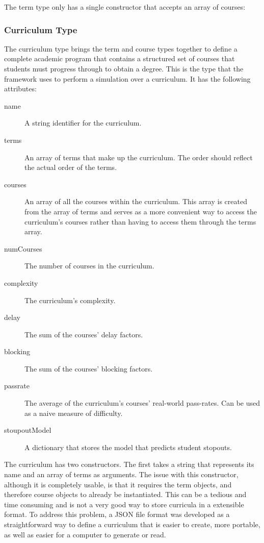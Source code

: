 \documentclass[botnum, fleqn]{unmeethesis}
\begin{document}
      The term type only has a single constructor that accepts an array of courses:

      

    \subsubsection{Curriculum Type}
      The curriculum type brings the term and course types together to define a complete academic program that contains a structured set of courses that students must progress through to obtain a degree. This is the type that the framework uses to perform a simulation over a curriculum. It has the following attributes:

      \begin{description}
        \item [name] A string identifier for the curriculum.
        \item [terms] An array of terms that make up the curriculum. The order should reflect the actual order of the terms.
        \item [courses] An array of all the courses within the curriculum. This array is created from the array of terms and serves as a more convenient way to access the curriculum's courses rather than having to access them through the terms array.
        \item [numCourses] The number of courses in the curriculum.
        \item [complexity] The curriculum's complexity.
        \item [delay] The sum of the courses' delay factors.
        \item [blocking] The sum of the courses' blocking factors.
        \item [passrate] The average of the curriculum's courses' real-world pass-rates. Can be used as a naive measure of difficulty.
        \item [stoupoutModel] A dictionary that stores the model that predicts student stopouts.
      \end{description}

      The curriculum has two constructors. The first takes a string that represents its name and an array of terms as arguments. The issue with this constructor, although it is completely usable, is that it requires the term objects, and therefore course objects to already be instantiated. This can be a tedious and time consuming and is not a very good way to store curricula in a extensible format. To address this problem, a JSON file format was developed as a straightforward way to define a curriculum that is easier to create, more portable, as well as easier for a computer to generate or read.
\end{document}
